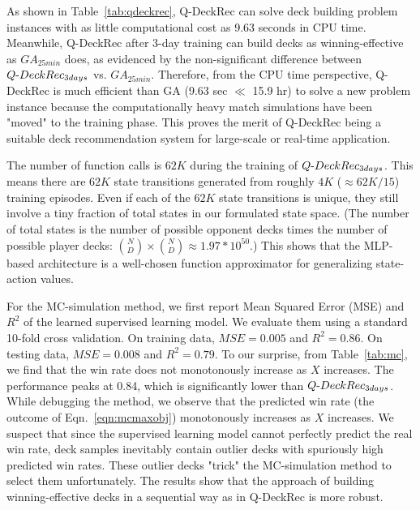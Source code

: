 
As shown in Table~\ref{tab:qdeckrec}, Q-DeckRec can solve deck building problem instances with as little computational cost as 9.63 seconds in CPU time. Meanwhile, Q-DeckRec after 3-day training can build decks as winning-effective as $GA_{25min}$ does, as evidenced by the non-significant difference between $Q\textnormal{-}DeckRec_{ 3days}$ vs. $GA_{25min}$. Therefore, from the CPU time perspective, Q-DeckRec is much efficient than GA ({9.63 sec $\ll$ 15.9 hr}) to solve a new problem instance because the computationally heavy match simulations have been "moved" to the training phase. This proves the merit of Q-DeckRec being a suitable deck recommendation system for large-scale or real-time application. 

The number of function calls is $62K$ during the training of $Q\textnormal{-}DeckRec_{3days}$. This means there are $62K$ state transitions generated from roughly $4K$ ($\approx 62K/15$) training episodes. Even if each of the $62K$ state transitions is unique, they still involve a tiny fraction of total states in our formulated state space. (The number of total states is the number of possible opponent decks times the number of possible player decks: ${N\choose D} \times {N\choose D} \approx 1.97 * 10^{50}$.) This shows that the MLP-based architecture is a well-chosen function approximator for generalizing state-action values.    


For the MC-simulation method, we first report Mean Squared Error (MSE) and $R^2$ of the learned supervised learning model. We evaluate them using a standard 10-fold cross validation. On training data, $MSE=0.005$ and $R^2=0.86$. On testing data, $MSE=0.008$ and $R^2=0.79$. To our surprise, from Table~\ref{tab:mc}, we find that the win rate does not monotonously increase as $X$ increases. The performance peaks at 0.84, which is significantly lower than $Q\textnormal{-}DeckRec_{3days}$. While debugging the method, we observe that the predicted win rate (the outcome of Eqn.~\ref{eqn:mcmaxobj}) monotonously increases as $X$ increases. We suspect that since the supervised learning model cannot perfectly predict the real win rate, deck samples inevitably contain outlier decks with spuriously high predicted win rates. These outlier decks "trick" the MC-simulation method to select them unfortunately. The results show that the approach of building winning-effective decks in a sequential way as in Q-DeckRec is more robust.



